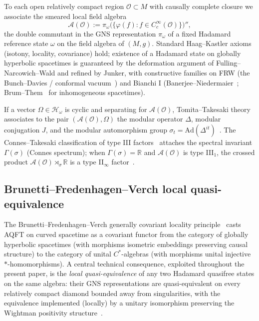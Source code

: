 \documentclass[11pt]{article}
\theoremstyle{definition}
\newcommand{\R}{\mathbb{R}}
\newcommand{\HH}{\mathcal{H}}
\renewcommand{\AA}{\mathcal{A}}
\newcommand{\OO}{\mathcal{O}}
\begin{document}
To each open relatively compact region $\OO\subset M$ with causally complete closure we associate the smeared local field algebra
\begin{equation}\label{eq:algebra-def}
\AA(\OO) := \pi_\omega\bigl(\{\varphi(f) : f\in C_c^\infty(\OO)\}\bigr)'',
\end{equation}
the double commutant in the GNS representation $\pi_\omega$ of a fixed Hadamard reference state $\omega$ on the field algebra of $(M,g)$. Standard Haag--Kastler axioms (isotony, locality, covariance) hold; existence of a Hadamard state on globally hyperbolic spacetimes is guaranteed by the deformation argument of Fulling--Narcowich--Wald and refined by Junker, with constructive families on FRW (the Bunch--Davies / conformal vacuum~\cite[\S5.4]{Wald1994}) and Bianchi I (Banerjee--Niedermaier~\cite{BanerjeeNiedermaier2023}; Brum--Them~\cite{BrumThem2013} for inhomogeneous spacetimes).

If a vector $\Omega\in\HH_\omega$ is cyclic and separating for $\AA(\OO)$, Tomita--Takesaki theory associates to the pair $(\AA(\OO),\Omega)$ the modular operator $\Delta$, modular conjugation $J$, and the modular automorphism group $\sigma_t = \mathrm{Ad}(\Delta^{it})$~\cite{BratteliRobinsonII}. The Connes--Takesaki classification of type III factors~\cite{Connes1973} attaches the spectral invariant $\Gamma(\sigma)$ (Connes spectrum); when $\Gamma(\sigma)=\R$ and $\AA(\OO)$ is type III$_1$, the crossed product $\AA(\OO)\rtimes_\sigma\R$ is a type II$_\infty$ factor~\cite{TakesakiII}.

\subsection{Brunetti--Fredenhagen--Verch local quasi-equivalence}\label{sec:bfv}

The Brunetti--Fredenhagen--Verch generally covariant locality principle~\cite{BrunettiFredenhagenVerch2003} casts AQFT on curved spacetime as a covariant functor from the category of globally hyperbolic spacetimes (with morphisms isometric embeddings preserving causal structure) to the category of unital $C^*$-algebras (with morphisms unital injective $*$-homomorphisms). A central technical consequence, exploited throughout the present paper, is the \emph{local quasi-equivalence} of any two Hadamard quasifree states on the same algebra: their GNS representations are quasi-equivalent on every relatively compact diamond bounded away from singularities, with the equivalence implemented (locally) by a unitary isomorphism preserving the Wightman positivity structure~\cite{Verch1994}.
\end{document}
